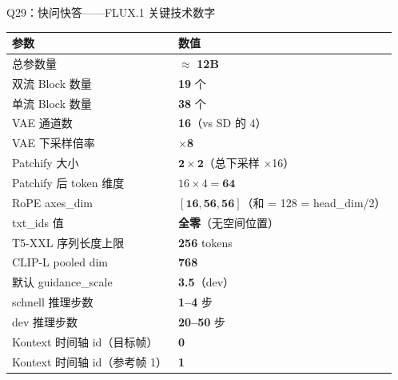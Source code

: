 \begin{conceptbox}{Q29：快问快答——FLUX.1 关键技术数字}
\begin{center}
\small
\begin{tabular}{|l|l|}
\hline
\textbf{参数} & \textbf{数值} \\
\hline
总参数量 & $\approx$ \textbf{12B} \\
双流 Block 数量 & \textbf{19} 个 \\
单流 Block 数量 & \textbf{38} 个 \\
VAE 通道数 & \textbf{16}（vs SD 的 4）\\
VAE 下采样倍率 & $\times$\textbf{8} \\
Patchify 大小 & $\mathbf{2\times2}$（总下采样 $\times$16）\\
Patchify 后 token 维度 & $16 \times 4 = \mathbf{64}$ \\
RoPE axes\_dim & $[\mathbf{16, 56, 56}]$（和 = 128 = head\_dim/2）\\
txt\_ids 值 & \textbf{全零}（无空间位置）\\
T5-XXL 序列长度上限 & \textbf{256} tokens \\
CLIP-L pooled dim & \textbf{768} \\
默认 guidance\_scale & \textbf{3.5}（dev）\\
schnell 推理步数 & \textbf{1--4} 步 \\
dev 推理步数 & \textbf{20--50} 步 \\
Kontext 时间轴 id（目标帧） & \textbf{0} \\
Kontext 时间轴 id（参考帧 1） & \textbf{1} \\
\hline
\end{tabular}
\end{center}
\end{conceptbox}


